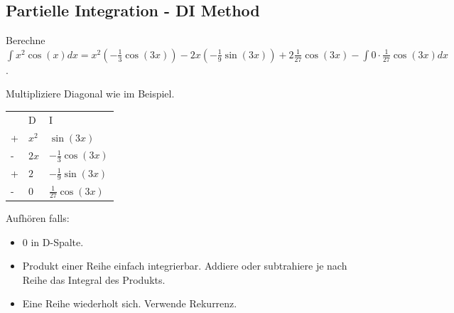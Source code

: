 \documentclass[a4paper,10pt]{article}
\begin{document}
\subsection{Partielle Integration - DI Method}
Berechne $\int x^2 \cos(x) dx = x^2 (-\frac{1}{3}\cos(3x)) - 2x(-\frac{1}{9}\sin(3x)) + 2\frac{1}{27}\cos(3x) - \int 0 \cdot \frac{1}{27} \cos(3x) dx$.

Multipliziere Diagonal wie im Beispiel.

\begin{table}[h]
  \begin{tabular}{lll}
    & D & I \\
  + & $x^2$ & $\sin(3x)$  \\
  - & $2x$ & $-\frac{1}{3}\cos(3x)$  \\
  + & $2$ & $-\frac{1}{9}\sin(3x)$  \\
  - & $0$ & $\frac{1}{27}\cos(3x)$  
  \end{tabular}
\end{table}

Aufhören falls:
\begin{itemize}
  \item $0$ in D-Spalte.
  \item Produkt einer Reihe einfach integrierbar. Addiere oder subtrahiere je nach Reihe das Integral des Produkts.
  \item Eine Reihe wiederholt sich. Verwende Rekurrenz.
\end{itemize}

\endgroup
\end{document}
